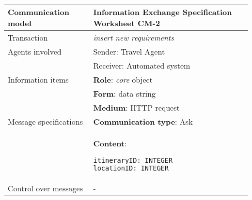 \newline
\vspace{0.8 cm}
\newline
\noindent
\begin{tabular}%
      {|p{4cm}%
        |p{8cm}|}
\hline
{\bf Communication model} &
   {\bf Information Exchange Specification Worksheet CM-2} \\
\hline
\hline
\sc Transaction &
   {\em
   insert new requirements
   } \\
\hline
\sc Agents involved &
   {\rm Sender: Travel Agent} \\
   & {\rm Receiver: Automated system}\\
\hline
\sc Information items 
&  {\bf Role}: {\em core} object
   \\
&  {\bf Form}: data string
   \\
&  {\bf Medium}: HTTP request
   \\
\hline
\sc Message specifications 
&  {\bf Communication type}: Ask
   \\
&  {\bf Content}: 
\begin{lstlisting}[breaklines=true,mathescape=true]
itineraryID: INTEGER
locationID: INTEGER
\end{lstlisting}
   \\
\hline
\sc Control over messages &
   - %
   \\
\hline
\end{tabular}
